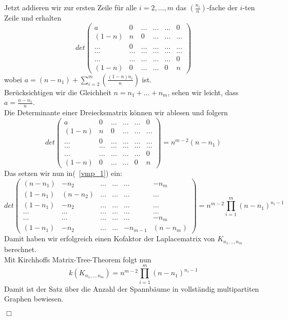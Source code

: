 Jetzt addieren wir zur ersten Zeile für alle $i=2,\ldots,m$ das $\left(\frac{n_i}{n}\right)$-fache der $i$-ten Zeile und erhalten
\begin{equation}
det
\begin{pmatrix}
 a&0&\ldots&\ldots&\ldots&0\\
 (1-n)&n&0&\ldots&\ldots&\ldots\\
 \ldots&0&\ldots&\ldots&\ldots&\ldots\\
 \ldots&\ldots&\ldots&\ldots&\ldots&\ldots\\
 \ldots&\ldots&\ldots&\ldots&\ldots&0\\
 (1-n)&0&\ldots&\ldots&0&n
\end{pmatrix}
\end{equation}
wobei $a = (n-n_1)+\sum_{i=2}^m\left(\frac{(1-n)n_i}{n}\right)$ ist.\\
Berücksichtigen wir die Gleichheit $n=n_1+\ldots+n_m$, sehen wir leicht, dass $a=\frac{n-n_1}{n}$.\\
Die Determinante einer Dreiecksmatrix können wir ablesen und folgern
\begin{equation}
det
\begin{pmatrix}
 a&0&\ldots&\ldots&\ldots&0\\
 (1-n)&n&0&\ldots&\ldots&\ldots\\
 \ldots&0&\ldots&\ldots&\ldots&\ldots\\
 \ldots&\ldots&\ldots&\ldots&\ldots&\ldots\\
 \ldots&\ldots&\ldots&\ldots&\ldots&0\\
 (1-n)&0&\ldots&\ldots&0&n
\end{pmatrix}
= n^{m-2}(n-n_1)
\end{equation}
Das setzen wir nun in(~\ref{vmp_1}) ein:
\begin{equation}
 det
\begin{pmatrix}
 (n-n_1)&-n_2&\ldots&\ldots&\ldots&-n_m\\
 (1-n_1)&(n-n_2)&\ldots&\ldots&\ldots&\ldots\\
 (1-n_1)&-n_2&\ldots&\ldots&\ldots&\ldots\\
 \ldots&\ldots&\ldots&\ldots&\ldots&\ldots\\
 \ldots&\ldots&\ldots&\ldots&\ldots&-n_m\\
 (1-n_1)&-n_2&\ldots&\ldots&-n_{m-1}&(n-n_m)
\end{pmatrix}
= n^{m-2}\prod_{i=1}^{m}(n-n_1)^{n_i-1}
\end{equation}
Damit haben wir erfolgreich einen Kofaktor der Laplacematrix von $K_{n_1,..,n_m}$ berechnet.\\
Mit Kirchhoffs Matrix-Tree-Theorem folgt nun
\begin{equation}
 \mathit{k}(K_{n_1,..,n_m})=n^{m-2}\prod_{i=1}^{m}(n-n_1)^{n_i-1}
\end{equation}
Damit ist der Satz über die Anzahl der Spannbäume in vollständig multipartiten Graphen bewiesen.
\begin{flushright} $\Box$ \end{flushright}
